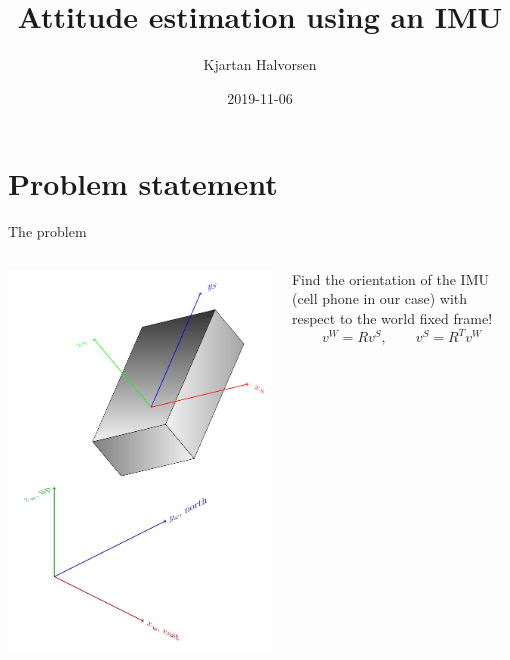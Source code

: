\documentclass[presentation,aspectratio=169]{beamer}
\author{Kjartan Halvorsen}
\date{2019-11-06}
\title{Attitude estimation using an IMU}
\begin{document}
\maketitle
\section{Problem statement}
\label{sec-1}
\begin{frame}[label=sec-1-1]{The problem}
\begin{columns}
\begin{column}{0.4\textwidth}
\begin{center}
\includegraphics[width=.92\linewidth]{imu-cube}
\end{center}
\end{column}
\begin{column}{0.6\textwidth}
Find the orientation of the IMU (cell phone in our case) with respect to the world fixed frame!
\[ v^W = Rv^S, \qquad v^S = R^T v^W\]
\end{column}
\end{columns}
\end{frame}
\end{document}
